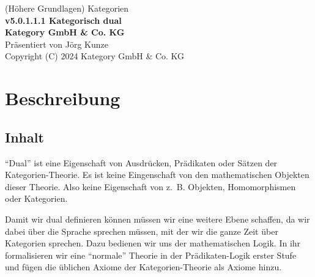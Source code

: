 \documentclass[a4paper]{amsart}
\theoremstyle{definition}
\newcommand{\zb}{z.~B. }
\begin{document}
\begin{titlepage}
\centering
{\huge
(Höhere Grundlagen) Kategorien\\[1cm]
\textbf{v5.0.1.1.1 Kategorisch dual}
}\\[1cm]

\textbf{Kategory GmbH \& Co. KG}\\
Präsentiert von Jörg Kunze\\
Copyright (C) 2024 Kategory GmbH \& Co. KG

\end{titlepage}

%

\newpage

\section*{Beschreibung}

\subsection*{Inhalt}
"`Dual"' ist eine Eigenschaft von Ausdrücken, Prädikaten oder Sätzen der Kategorien-Theorie. Es ist keine Eingenschaft von den mathematischen Objekten dieser Theorie. Also keine Eigenschaft von \zb Objekten, Homomorphismen oder Kategorien.

Damit wir dual definieren können müssen wir eine weitere Ebene schaffen, da wir dabei über die Sprache sprechen müssen, mit der wir die ganze Zeit über Kategorien sprechen. Dazu bedienen wir uns der mathematischen Logik. In ihr formalisieren wir eine "`normale"' Theorie in der Prädikaten-Logik erster Stufe und fügen die üblichen Axiome der Kategorien-Theorie als Axiome hinzu. 
\end{document}
